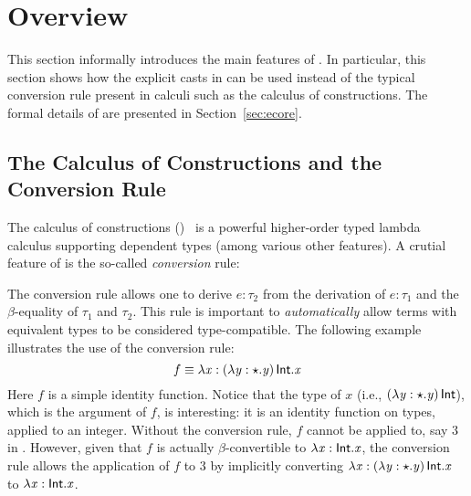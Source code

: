 \HaskellReset

\makeatother
\EndFmtInput

\section{Overview}

This section informally introduces the main features of \name. In
particular, this section shows how the explicit casts in \name can be
used instead of the typical conversion rule present in calculi such as
the calculus of constructions. The formal details of \name are
presented in Section~\ref{sec:ecore}. 

\subsection{The Calculus of Constructions and the Conversion Rule}
\label{sec:coc}

The calculus of constructions (\coc)~\cite{coc} is a powerful
higher-order typed lambda calculus supporting dependent types (among
various other features).  A crutial
feature of \coc is the so-called \emph{conversion}
rule: \ottusedrule{\ottdruleTccXXConv{}}


The conversion rule allows one to derive $e:\tau_{{\mathrm{2}}}$ from the
derivation of $e:\tau_{{\mathrm{1}}}$ and the $\beta$-equality of $\tau_{{\mathrm{1}}}$ and
$\tau_{{\mathrm{2}}}$. This rule is important to \emph{automatically} allow terms
with equivalent types to be considered type-compatible.  The following
example illustrates the use of the conversion rule:
\[
f \equiv \lambda  \mathit{x}  :  (  \lambda  \mathit{y}  :  \star  .  \mathit{y}  ) \, \mathsf{Int}  .  \mathit{x}
\]
Here $f$ is a simple identity function. Notice that the type of $x$
(i.e., $(  \lambda  \mathit{y}  :  \star  .  \mathit{y}  ) \, \mathsf{Int}$), which is the argument of $f$, is
interesting: it is an identity function on types, applied to an
integer.  Without the conversion rule, $f$ cannot be applied to, say
$3$ in \coc. However, given that $f$ is actually $\beta$-convertible
to $\lambda  \mathit{x}  :  \mathsf{Int}  .  \mathit{x}$, the conversion rule allows the application of $f$
to $3$ by implicitly converting $\lambda  \mathit{x}  :  (  \lambda  \mathit{y}  :  \star  .  \mathit{y}  ) \, \mathsf{Int}  .  \mathit{x}$ to
$\lambda  \mathit{x}  :  \mathsf{Int}  .  \mathit{x}$.

